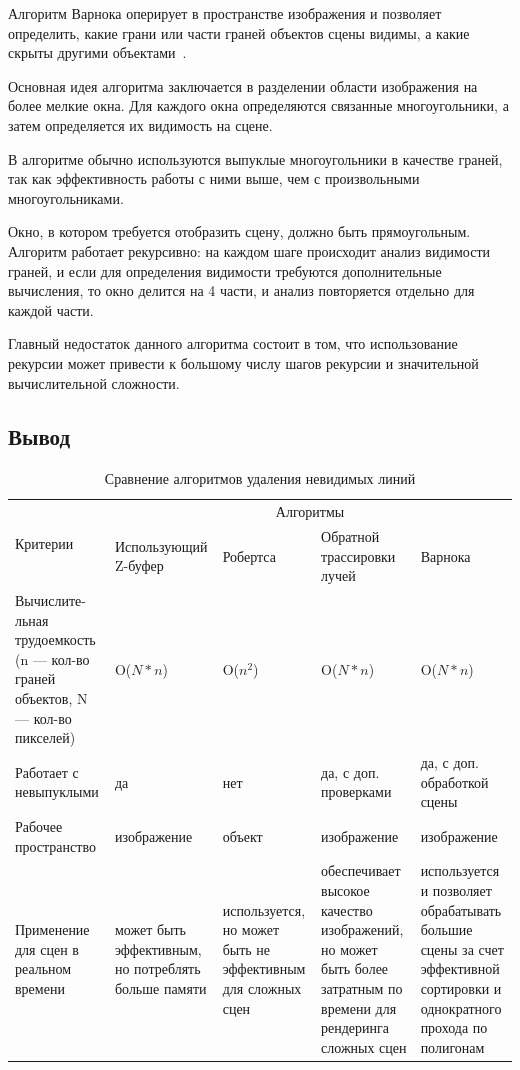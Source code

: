 Алгоритм Варнока оперирует в пространстве изображения и позволяет определить, какие грани или части граней объектов сцены видимы, а какие скрыты другими объектами~\cite{roders}.

Основная идея алгоритма заключается в разделении области изображения на более мелкие окна. Для каждого окна определяются связанные многоугольники, а затем определяется их видимость на сцене.

В алгоритме обычно используются выпуклые многоугольники в качестве граней, так как эффективность работы с ними выше, чем с произвольными многоугольниками.

Окно, в котором требуется отобразить сцену, должно быть прямоугольным. Алгоритм работает рекурсивно: на каждом шаге происходит анализ видимости граней, и если для определения видимости требуются дополнительные вычисления, то окно делится на 4 части, и анализ повторяется отдельно для каждой части.

Главный недостаток данного алгоритма состоит в том, что использование рекурсии может привести к большому числу шагов рекурсии и значительной вычислительной сложности.


\subsection*{Вывод}

\begin{table} [] 
	\caption{Сравнение алгоритмов удаления невидимых линий}
	\label{tbl:alg_del}
	\begin{tabular}{|p{}|p{}|p{}|p{}|p{}|}
		\hline
		\multirow{2}{*}{Критерии} & \multicolumn{4}{|c|}{Алгоритмы} \\
		\cline{2-5}
		& Использующий Z-буфер & Робертса & Обратной трассировки лучей & Варнока  \\
		\hline
		Вычислите-
		льная трудоемкость (n --- кол-во граней объектов, N --- кол-во пикселей)& O($N*n$) & O($n^2$) &  O($N*n$) & O($N*n$) \\		
		\hline
		Работает с невыпуклыми & да & нет & да, с доп. проверками & да, с доп. обработкой сцены\\
		\hline
		Рабочее пространство & изображение & объект & изображение & изображение \\ 
		\hline 
		Применение для сцен в реальном времени & может быть эффективным, но потреблять больше памяти & используется, но может быть не эффективным для сложных сцен & обеспечивает высокое качество изображений, но может быть более затратным по времени для рендеринга сложных сцен & используется и позволяет обрабатывать большие сцены за счет эффективной сортировки и однократного прохода по полигонам \\
		\hline
	\end{tabular}
\end{table}



